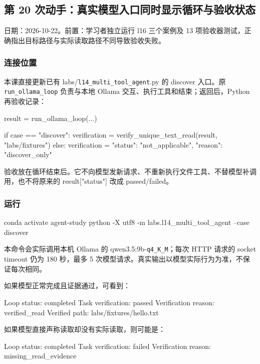 \subsection{第 20 次动手：真实模型入口同时显示循环与验收状态}

日期：2026-10-22。前置：学习者独立运行 l16 三个案例及 13 项验收器测试，正确指出目标路径与实际读取路径不同导致验收失败。

\subsubsection{连接位置}

本课直接更新已有 labs/\nolinkurl{l14_multi_tool_agent}.py 的 discover 入口。原 \nolinkurl{run_ollama_loop} 负责与本地 Ollama 交互、执行工具和结束；返回后，Python 再验收记录：

\begin{Code}
result = run_ollama_loop(...)

if case == "discover":
    verification = verify_unique_text_read(result, "labs/fixtures")
else:
    verification = {"status": "not_applicable", "reason": "discover_only"}
\end{Code}

验收放在循环结束后。它不向模型发新请求、不重新执行文件工具、不替模型补调用，也不将原来的 result["status"] 改成 passed/failed。

\subsubsection{运行}

\begin{Code}
conda activate agent-study
python -X utf8 -m labs.l14_multi_tool_agent --case discover
\end{Code}

本命令会实际调用本机 Ollama 的 qwen3.5:9b-\nolinkurl{q4_K_M}；每次 HTTP 请求的 socket timeout 仍为 180 秒，最多 5 次模型请求。真实输出以模型实际行为为准，不保证每次相同。

如果模型正常完成且证据通过，可看到：

\begin{Code}
Loop status: completed
Task verification: passed
Verification reason: verified_read
Verified path: labs/fixtures/hello.txt
\end{Code}

如果模型直接声称读取却没有实际读取，则可能是：

\begin{Code}
Loop status: completed
Task verification: failed
Verification reason: missing_read_evidence
\end{Code}

